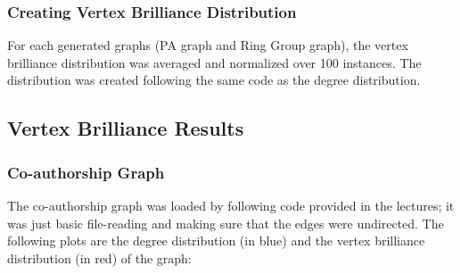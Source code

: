 \documentclass[11pt,a4paper,notitlepage]{article}
\begin{document}
\subsubsection*{Creating Vertex Brilliance Distribution}
For each generated graphs (PA graph and Ring Group graph), the vertex brilliance distribution was averaged and normalized over 100 instances. The distribution was created following the same code as the degree distribution.

\subsection*{Vertex Brilliance Results}
\subsubsection*{Co-authorship Graph}
The co-authorship graph was loaded by following code provided in the lectures; it was just basic file-reading and making sure that the edges were undirected. The following plots are the degree distribution (in blue) and the vertex brilliance distribution (in red) of the graph:
\end{document}
